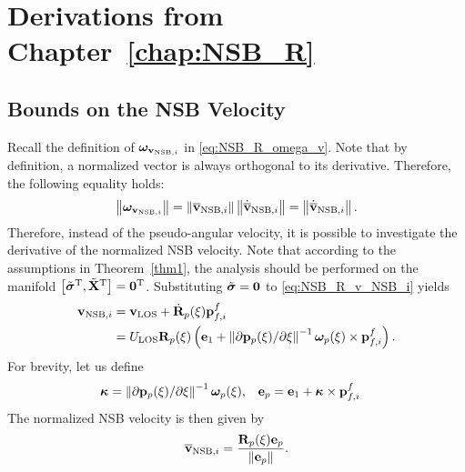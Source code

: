 \chapter{Derivations from Chapter~\ref{chap:NSB_R}}
\label{app:NSB_R}

\section{Bounds on the NSB Velocity}
\label{app:v_NSB}
Recall the definition of $\bm{\omega}_{\mathbf{v}_{{\rm NSB},i}}$ in \eqref{eq:NSB_R_omega_v}.
Note that by definition, a normalized vector is always orthogonal to its derivative.
Therefore, the following equality holds:
\begin{equation}
    \left\|\bm{\omega}_{\mathbf{v}_{{\rm NSB}, i}}\right\| = \left\|\overline{\mathbf{v}}_{{\rm NSB}, i}\right\|\left\|\dot{\overline{\mathbf{v}}}_{{\rm NSB}, i}\right\|
    = \left\|\dot{\overline{\mathbf{v}}}_{{\rm NSB}, i}\right\|.
\end{equation}
Therefore, instead of the pseudo-angular velocity, it is possible to investigate the derivative of the normalized NSB velocity.
Note that according to the assumptions in Theorem~\ref{thm1}, the analysis should be performed on the manifold $\left[\tilde{\bm{\sigma}}^{\mathrm{T}}, \tilde{\mathbf{X}}^{\mathrm{T}}\right] = \mathbf{0}^{\mathrm{T}}$.
Substituting $\tilde{\bm{\sigma}} = \mathbf{0}$ to \eqref{eq:NSB_R_v_NSB_i} yields
\begin{equation}
    \begin{split}
        \mathbf{v}_{{\rm NSB}, i} &= \mathbf{v}_{\rm LOS} + \dot{\mathbf{R}}_p(\xi)\mathbf{p}_{f,i}^f \\
        &= U_{\rm LOS}\mathbf{R}_p(\xi) \left(\mathbf{e}_1 + \left\|\partial \mathbf{p}_p(\xi) / \partial \xi\right\|^{-1}\bm{\omega}_p(\xi) \times \mathbf{p}_{f,i}^f\right).
    \end{split}
    \label{eq:NSB_R_v_NSB_i_nominal}
\end{equation}
For brevity, let us define
\begin{align}
    \bm{\kappa} &= \left\|\partial \mathbf{p}_p(\xi) / \partial \xi\right\|^{-1}\bm{\omega}_p(\xi), &
    \mathbf{e}_p &= \mathbf{e}_1 + \bm{\kappa} \times \mathbf{p}_{f,i}^f
\end{align}
The normalized NSB velocity is then given by
\begin{equation}
    \overline{\mathbf{v}}_{{\rm NSB}, i} = \frac{\mathbf{R}_p(\xi) \mathbf{e}_p}{\left\|\mathbf{e}_p\right\|}.
    \label{eq:NSB_R_v_NSB_i_normalized}
\end{equation}
